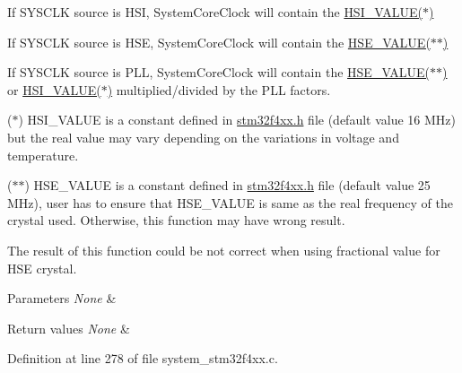 \begin{DoxyItemize}
\item If S\+Y\+S\+C\+LK source is H\+SI, System\+Core\+Clock will contain the \hyperlink{group___library__configuration__section_gaaa8c76e274d0f6dd2cefb5d0b17fbc37}{H\+S\+I\+\_\+\+V\+A\+L\+U\+E($\ast$)}
\item If S\+Y\+S\+C\+LK source is H\+SE, System\+Core\+Clock will contain the \hyperlink{group___library__configuration__section_gaeafcff4f57440c60e64812dddd13e7cb}{H\+S\+E\+\_\+\+V\+A\+L\+U\+E($\ast$$\ast$)}
\item If S\+Y\+S\+C\+LK source is P\+LL, System\+Core\+Clock will contain the \hyperlink{group___library__configuration__section_gaeafcff4f57440c60e64812dddd13e7cb}{H\+S\+E\+\_\+\+V\+A\+L\+U\+E($\ast$$\ast$)} or \hyperlink{group___library__configuration__section_gaaa8c76e274d0f6dd2cefb5d0b17fbc37}{H\+S\+I\+\_\+\+V\+A\+L\+U\+E($\ast$)} multiplied/divided by the P\+LL factors.
\end{DoxyItemize}

($\ast$) H\+S\+I\+\_\+\+V\+A\+L\+UE is a constant defined in \hyperlink{stm32f4xx_8h}{stm32f4xx.\+h} file (default value 16 M\+Hz) but the real value may vary depending on the variations in voltage and temperature.

($\ast$$\ast$) H\+S\+E\+\_\+\+V\+A\+L\+UE is a constant defined in \hyperlink{stm32f4xx_8h}{stm32f4xx.\+h} file (default value 25 M\+Hz), user has to ensure that H\+S\+E\+\_\+\+V\+A\+L\+UE is same as the real frequency of the crystal used. Otherwise, this function may have wrong result.


\begin{DoxyItemize}
\item The result of this function could be not correct when using fractional value for H\+SE crystal.
\end{DoxyItemize}


\begin{DoxyParams}{Parameters}
{\em None} & \\
\hline
\end{DoxyParams}

\begin{DoxyRetVals}{Return values}
{\em None} & \\
\hline
\end{DoxyRetVals}


Definition at line 278 of file system\+\_\+stm32f4xx.\+c.

\mbox{\label{group___s_t_m32_f4xx___system___private___functions_ga93f514700ccf00d08dbdcff7f1224eb2}} 
